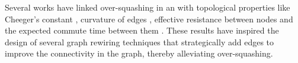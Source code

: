 Several works have linked over-squashing in an  with topological properties like Cheeger's constant \cite{giraldo2023trading,karhadkar2023fosr}, curvature of edges \cite{topping2022understanding,nguyen2023revisiting,liu2023curvdrop}, effective resistance between nodes \cite{black2023resistance,rodriguez2022diffwire} and the expected commute time between them \cite{di2023over,giovanni2024how}. These results have inspired the design of several graph rewiring techniques that strategically add edges to improve the connectivity in the graph, thereby alleviating over-squashing. %